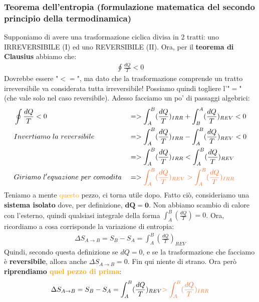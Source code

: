             \subsubsection{Teorema dell'entropia (formulazione matematica del secondo principio della termodinamica)}
                Supponiamo di avere una trasformazione ciclica divisa in 2 tratti: uno IRREVERSIBILE (I) ed uno REVERSIBILE (II).
                Ora, per il \textbf{teorema di Clausius} abbiamo che:
                \begin{align*}
                    \oint \frac{dQ}{T}<0
                \end{align*}
                Dovrebbe essere "$<=$", ma dato che la trasformazione comprende un tratto irreversibile va considerata tutta irreversibile! Possiamo quindi togliere l'"$=$" (che vale solo nel caso reversibile). Adesso facciamo un po' di passaggi algebrici:
                \begin{align*}
                    & \oint \frac{dQ}{T}<0 &&=>\int_A^B (\frac{dQ}{T})_{IRR} + \int_B^A (\frac{dQ}{T})_{REV}<0\\
                    & Invertiamo\ la\ reversibile &&=>\int_A^B (\frac{dQ}{T})_{IRR} - \int_A^B (\frac{dQ}{T})_{REV}<0\\
                    & &&=>\int_A^B (\frac{dQ}{T})_{IRR} < \int_A^B (\frac{dQ}{T})_{REV}\\
                    & Giriamo\ l'equazione\ per\ comodita &&=>\textcolor{Orange}{\int_A^B (\frac{dQ}{T})_{REV} > \int_A^B (\frac{dQ}{T})_{IRR}}\\
                \end{align*}
                Teniamo a mente \textcolor{Orange}{questo} pezzo, ci torna utile dopo. Fatto ciò, consideriamo una \textbf{sistema isolato} dove, per definizione, $\mathbf{dQ = 0}$. Non abbiamo scambio di calore con l'esterno, quindi qualsiasi integrale della forma $\int_A^B (\frac{dQ}{T}) = 0$. Ora, ricordiamo a cosa corrisponde la variazione di entropia:
                \begin{align*}
                    \Delta S_{A\rightarrow B} = S_B-S_A=\int_A^B (\frac{dQ}{T})_{REV}
                \end{align*}
                Quindi, secondo questa definizione se $dQ = 0$, e se la trasformazione che facciamo è \textbf{reversibile}, allora anche $\Delta S_{A\rightarrow B} = 0$. Fin qui niente di strano. Ora però \textbf{riprendiamo \textcolor{Orange}{quel pezzo di prima}}:
                \begin{align*}
                    \Delta S_{A\rightarrow B} = S_B-S_A=\int_A^B (\frac{dQ}{T})_{REV} \textcolor{Orange}{>\int_A^B (\frac{dQ}{T})_{IRR}}
                \end{align*}
